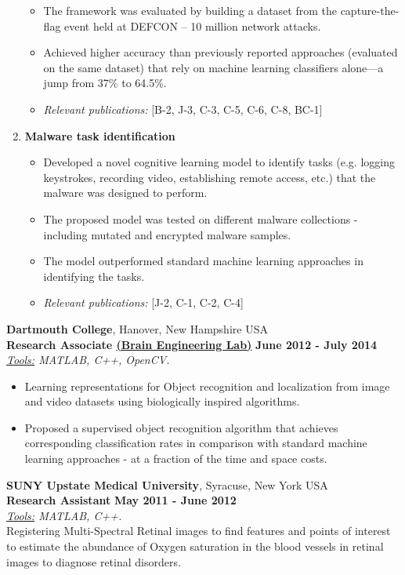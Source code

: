 \documentclass[margin,line]{CV}
\begin{document}
\begin{resume}
\begin{enumerate}
\begin{itemize}
		\item The framework was evaluated by building a dataset from the capture-the-flag event held at DEFCON -- 10 million network attacks. 
		
		\item Achieved higher accuracy than previously reported approaches (evaluated on the same dataset) that rely on machine learning classifiers alone---a jump from 37\% to 64.5\%.
		
		\item {\em Relevant publications:} [B-2, J-3, C-3, C-5, C-6, C-8, BC-1]
		
	\end{itemize}
	
	
	\item {\bf{Malware task identification}} 
	\begin{itemize}
		\item Developed a novel cognitive learning model to identify tasks (e.g. logging keystrokes, recording video, establishing remote access, etc.) that the malware was designed to perform. 
		\item The proposed model was tested on different malware collections - including mutated and encrypted malware samples. 
		\item The model outperformed standard machine learning approaches in identifying the tasks.
		\item {\em Relevant publications:} [J-2, C-1, C-2, C-4]
	\end{itemize}
	

\end{enumerate}

{\bf Dartmouth College}, Hanover, New Hampshire USA\\
{\bf Research Associate \href{https://www.dartmouth.edu/~rhg/}{(Brain Engineering Lab)}} \hfill {\bf June 2012 - July 2014}\\
\textit{\underline{Tools:} MATLAB, C++, OpenCV.}
\begin{itemize}
	\item Learning representations for Object recognition and localization from image and video datasets using biologically inspired algorithms.
	\item Proposed a supervised object recognition algorithm that achieves corresponding classification rates in comparison with standard machine learning approaches - at a fraction of the time and space costs.
\end{itemize}
 

{\bf SUNY Upstate Medical University}, Syracuse, New York USA\\
{\bf Research Assistant} \hfill {\bf May 2011 - June 2012}\\
\textit{\underline{Tools:} MATLAB, C++.}\\
Registering Multi-Spectral Retinal images to find features and points of interest to estimate the abundance of Oxygen saturation in the blood vessels in retinal images to diagnose retinal disorders.


\end{resume}
\end{document}
